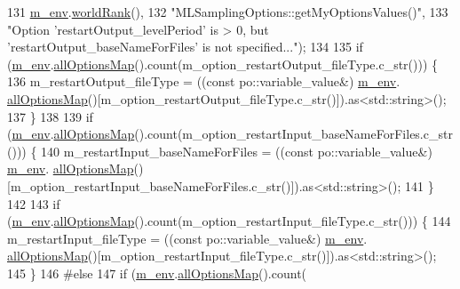 \begin{DoxyCode}
131                       \hyperlink{class_q_u_e_s_o_1_1_m_l_sampling_options_a28d73f222e9b20f1c749ed808f69eebd}{m\_env}.\hyperlink{class_q_u_e_s_o_1_1_base_environment_a78b57112bbd0e6dd0e8afec00b40ffa7}{worldRank}(),
132                       \textcolor{stringliteral}{"MLSamplingOptions::getMyOptionsValues()"},
133                       \textcolor{stringliteral}{"Option 'restartOutput\_levelPeriod' is > 0, but 'restartOutput\_baseNameForFiles' is
       not specified..."});
134 
135   \textcolor{keywordflow}{if} (\hyperlink{class_q_u_e_s_o_1_1_m_l_sampling_options_a28d73f222e9b20f1c749ed808f69eebd}{m\_env}.\hyperlink{class_q_u_e_s_o_1_1_base_environment_ae7cee155956e0e70112f45e2ad1f02c8}{allOptionsMap}().count(m\_option\_restartOutput\_fileType.c\_str())) \{
136     m\_restartOutput\_fileType = ((\textcolor{keyword}{const} po::variable\_value&) \hyperlink{class_q_u_e_s_o_1_1_m_l_sampling_options_a28d73f222e9b20f1c749ed808f69eebd}{m\_env}.
      \hyperlink{class_q_u_e_s_o_1_1_base_environment_ae7cee155956e0e70112f45e2ad1f02c8}{allOptionsMap}()[m\_option\_restartOutput\_fileType.c\_str()]).as<std::string>();
137   \}
138 
139   \textcolor{keywordflow}{if} (\hyperlink{class_q_u_e_s_o_1_1_m_l_sampling_options_a28d73f222e9b20f1c749ed808f69eebd}{m\_env}.\hyperlink{class_q_u_e_s_o_1_1_base_environment_ae7cee155956e0e70112f45e2ad1f02c8}{allOptionsMap}().count(m\_option\_restartInput\_baseNameForFiles.c\_str())) \{
140     m\_restartInput\_baseNameForFiles = ((\textcolor{keyword}{const} po::variable\_value&) \hyperlink{class_q_u_e_s_o_1_1_m_l_sampling_options_a28d73f222e9b20f1c749ed808f69eebd}{m\_env}.
      \hyperlink{class_q_u_e_s_o_1_1_base_environment_ae7cee155956e0e70112f45e2ad1f02c8}{allOptionsMap}()[m\_option\_restartInput\_baseNameForFiles.c\_str()]).as<std::string>();
141   \}
142 
143   \textcolor{keywordflow}{if} (\hyperlink{class_q_u_e_s_o_1_1_m_l_sampling_options_a28d73f222e9b20f1c749ed808f69eebd}{m\_env}.\hyperlink{class_q_u_e_s_o_1_1_base_environment_ae7cee155956e0e70112f45e2ad1f02c8}{allOptionsMap}().count(m\_option\_restartInput\_fileType.c\_str())) \{
144     m\_restartInput\_fileType = ((\textcolor{keyword}{const} po::variable\_value&) \hyperlink{class_q_u_e_s_o_1_1_m_l_sampling_options_a28d73f222e9b20f1c749ed808f69eebd}{m\_env}.
      \hyperlink{class_q_u_e_s_o_1_1_base_environment_ae7cee155956e0e70112f45e2ad1f02c8}{allOptionsMap}()[m\_option\_restartInput\_fileType.c\_str()]).as<std::string>();
145   \}
146 \textcolor{preprocessor}{#else}
147 \textcolor{preprocessor}{}  \textcolor{keywordflow}{if} (\hyperlink{class_q_u_e_s_o_1_1_m_l_sampling_options_a28d73f222e9b20f1c749ed808f69eebd}{m\_env}.\hyperlink{class_q_u_e_s_o_1_1_base_environment_ae7cee155956e0e70112f45e2ad1f02c8}{allOptionsMap}().count(

\end{DoxyCode}
